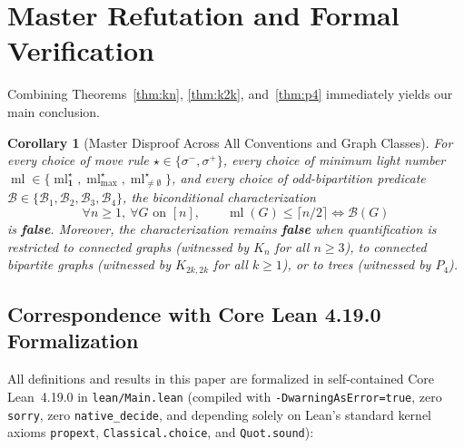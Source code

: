 \documentclass[11pt,a4paper]{article}
\newtheorem{corollary}[theorem]{Corollary}
\theoremstyle{definition}
\newcommand{\ml}{\operatorname{ml}}
\newcommand{\ceilhalf}[1]{\lceil #1 / 2 \rceil}
\begin{document}
\section{Master Refutation and Formal Verification}

Combining Theorems~\ref{thm:kn}, \ref{thm:k2k}, and~\ref{thm:p4} immediately yields
our main conclusion.

\begin{corollary}[Master Disproof Across All Conventions and Graph Classes]
\label{cor:master}
For every choice of move rule $\star \in \{\sigma^-, \sigma^+\}$, every choice of
minimum light number $\ml \in \{\ml_{\mathbf{1}}^\star, \ml_{\max}^\star, \ml_{\neq\emptyset}^\star\}$,
and every choice of odd-bipartition predicate $\mathcal{B} \in \{\mathcal{B}_1, \mathcal{B}_2, \mathcal{B}_3, \mathcal{B}_4\}$,
the biconditional characterization
\[
\forall n \ge 1,\ \forall G \text{ on } [n],\qquad
\ml(G) \le \ceilhalf{n} \iff \mathcal{B}(G)
\]
is \textbf{false}. Moreover, the characterization remains \textbf{false} when
quantification is restricted to connected graphs (witnessed by $K_n$ for all $n \ge 3$),
to connected bipartite graphs (witnessed by $K_{2k,2k}$ for all $k \ge 1$), or to
trees (witnessed by $P_4$).
\end{corollary}

\subsection*{Correspondence with Core Lean 4.19.0 Formalization}

All definitions and results in this paper are formalized in self-contained Core
Lean~4.19.0 in \texttt{lean/Main.lean} (compiled with \texttt{-DwarningAsError=true},
zero \texttt{sorry}, zero \texttt{native\_decide}, and depending solely on Lean's
standard kernel axioms \texttt{propext}, \texttt{Classical.choice}, and
\texttt{Quot.sound}):
\end{document}
